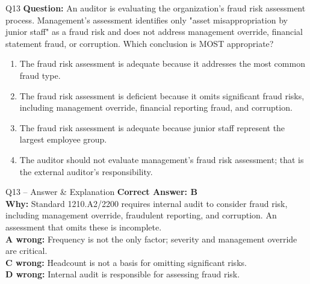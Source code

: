 \documentclass[aspectratio=169,10pt]{beamer}
\begin{document}
	\begin{frame}[t]{Q13}
		\small
		\textbf{Question:} An auditor is evaluating the organization's fraud risk assessment process. Management's assessment identifies only "asset misappropriation by junior staff" as a fraud risk and does not address management override, financial statement fraud, or corruption. Which conclusion is MOST appropriate?
		\begin{enumerate}[label=\Alph*.,itemsep=1pt,topsep=2pt]
			\item The fraud risk assessment is adequate because it addresses the most common fraud type.
			\item The fraud risk assessment is deficient because it omits significant fraud risks, including management override, financial reporting fraud, and corruption.
			\item The fraud risk assessment is adequate because junior staff represent the largest employee group.
			\item The auditor should not evaluate management's fraud risk assessment; that is the external auditor's responsibility.
		\end{enumerate}
	\end{frame}
	
	\begin{frame}[t]{Q13 -- Answer \& Explanation}
		\small
		\textbf{Correct Answer: B} \\[4pt]
		\textbf{Why:} Standard 1210.A2/2200 requires internal audit to consider fraud risk, including management override, fraudulent reporting, and corruption. An assessment that omits these is incomplete. \\[4pt]
		\textbf{A wrong:} Frequency is not the only factor; severity and management override are critical. \\[2pt]
		\textbf{C wrong:} Headcount is not a basis for omitting significant risks. \\[2pt]
		\textbf{D wrong:} Internal audit is responsible for assessing fraud risk.
	\end{frame}
	
\end{document}
